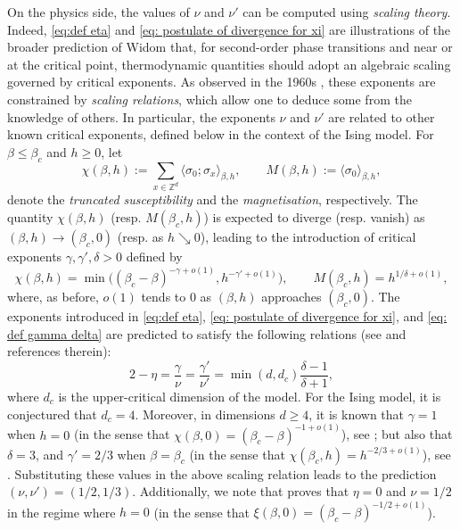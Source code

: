\documentclass[10pt,a4paper]{amsart}
\numberwithin{equation}{section}
\begin{document}
On the physics side, the values of $\nu$ and $\nu'$ can be computed using \emph{scaling theory}. Indeed, \eqref{eq:def eta} and \eqref{eq: postulate of divergence for xi} are illustrations of the broader prediction of Widom \cite{Widom1965equation} that, for second-order phase transitions and near or at the critical point, thermodynamic quantities should adopt an algebraic scaling governed by critical exponents. As observed in the 1960s \cite{Fisher1964correlation,EssamFisher1963pade}, these exponents are constrained by \emph{scaling relations}, which allow one to deduce some from the knowledge of others. In particular, the exponents $\nu$ and $\nu'$ are related to other known critical exponents, defined below in the context of the Ising model. For $\beta\leq \beta_c$ and $h\geq 0$, let
\begin{equation}
	\chi(\beta,h):=\sum_{x\in \mathbb Z^d}\langle \sigma_0;\sigma_x\rangle_{\beta,h}, \qquad M(\beta,h):=\langle \sigma_0\rangle_{\beta,h},
\end{equation}
denote the \emph{truncated susceptibility} and the \emph{magnetisation}, respectively. The quantity $\chi(\beta,h)$ (resp. $M(\beta_c,h)$) is expected to diverge (resp. vanish) as $(\beta,h)\to (\beta_c,0)$ (resp. as $h\searrow 0$), leading to the introduction of critical exponents $\gamma,\gamma',\delta>0$ defined by
\begin{equation}\label{eq: def gamma delta}
	\chi(\beta,h)=\min\bigl((\beta_c-\beta)^{-\gamma+o(1)},h^{-\gamma'+o(1)}\bigr), \qquad M(\beta_c,h)=h^{1/\delta+o(1)},
\end{equation}
where, as before, $o(1)$ tends to $0$ as $(\beta,h)$ approaches $(\beta_c,0)$. The exponents introduced in \eqref{eq:def eta}, \eqref{eq: postulate of divergence for xi}, and \eqref{eq: def gamma delta} are predicted to satisfy the following relations (see \cite{Fisher1998renormalization,DuminilreviewIsing} and references therein):
\begin{equation}\label{eq:scaling relation}
	2-\eta=\frac{\gamma}{\nu}=\frac{\gamma'}{\nu'}=\min(d,d_c)\frac{\delta-1}{\delta+1},
\end{equation}
where $d_c$ is the upper-critical dimension of the model. For the Ising model, it is conjectured that $d_c=4$. Moreover, in dimensions $d\geq 4$, it is known that $\gamma=1$ when $h=0$ (in the sense that $\chi(\beta,0)=(\beta_c-\beta)^{-1+o(1)}$), see \cite{AizenmanGeometricAnalysis1982,AizenmanGrahamRenormalizedCouplingSusceptibility4d1983}; but also that $\delta=3$, and $\gamma'=2/3$ when $\beta=\beta_c$ (in the sense that $\chi(\beta_c,h)=h^{-2/3+o(1)}$), see \cite{AizenmanFernandezCriticalBehaviorMagnetization1986}. Substituting these values in the above scaling relation leads to the prediction $(\nu,\nu')=(1/2,1/3)$. Additionally, we note that \cite{DuminilPanis2024newLB} proves that $\eta=0$ and $\nu=1/2$ in the regime where $h=0$ (in the sense that $\xi(\beta,0)=(\beta_c-\beta)^{-1/2+o(1)}$).
\end{document}
